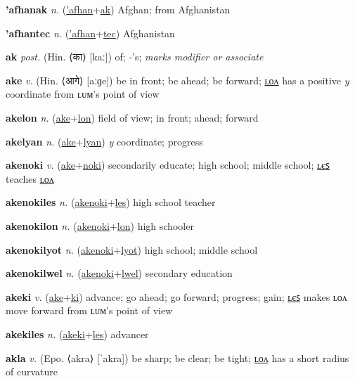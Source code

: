 \textbf{\hypertarget{'afhanak}{'afhanak}} \textit{n.} (\hyperlink{'afhan}{'afhan}+\allowbreak \hyperlink{ak}{ak})
Afghan; from Afghanistan

\textbf{\hypertarget{'afhantec}{'afhantec}} \textit{n.} (\hyperlink{'afhan}{'afhan}+\allowbreak \hyperlink{tec}{tec})
Afghanistan

\textbf{\hypertarget{ak}{ak}} \textit{post.} (Hin. ⟨{\devanagari{}का}⟩ [kaː])
of; -’s; \textit{marks modifier or associate}

\textbf{\hypertarget{ake}{ake}} \textit{v.} (Hin. ⟨{\devanagari{}आगे}⟩ [aːɡe])
be in front; be ahead; be forward; \hyperlink{akelon}{ʟᴏᴧ} has a positive \textit{y} coordinate from ʟᴜᴍ’s point of view

\textbf{\hypertarget{akelon}{akelon}} \textit{n.} (\hyperlink{ake}{ake}+\allowbreak \hyperlink{lon}{lon})
field of view; in front; ahead; forward

\textbf{\hypertarget{akelyan}{akelyan}} \textit{n.} (\hyperlink{ake}{ake}+\allowbreak \hyperlink{lyan}{lyan})
\textit{y} coordinate; progress

\textbf{\hypertarget{akenoki}{akenoki}} \textit{v.} (\hyperlink{ake}{ake}+\allowbreak \hyperlink{noki}{noki})
secondarily educate; high school; middle school; \hyperlink{akenokiles}{ʟєꜱ} teaches \hyperlink{akenokilon}{ʟᴏᴧ}

\textbf{\hypertarget{akenokiles}{akenokiles}} \textit{n.} (\hyperlink{akenoki}{akenoki}+\allowbreak \hyperlink{les}{les})
high school teacher

\textbf{\hypertarget{akenokilon}{akenokilon}} \textit{n.} (\hyperlink{akenoki}{akenoki}+\allowbreak \hyperlink{lon}{lon})
high schooler

\textbf{\hypertarget{akenokilyot}{akenokilyot}} \textit{n.} (\hyperlink{akenoki}{akenoki}+\allowbreak \hyperlink{lyot}{lyot})
high school; middle school

\textbf{\hypertarget{akenokilwel}{akenokilwel}} \textit{n.} (\hyperlink{akenoki}{akenoki}+\allowbreak \hyperlink{lwel}{lwel})
secondary education

\textbf{\hypertarget{akeki}{akeki}} \textit{v.} (\hyperlink{ake}{ake}+\allowbreak \hyperlink{ki}{ki})
advance; go ahead; go forward; progress; gain; \hyperlink{akekiles}{ʟєꜱ} makes ʟᴏᴧ move forward from ʟᴜᴍ’s point of view

\textbf{\hypertarget{akekiles}{akekiles}} \textit{n.} (\hyperlink{akeki}{akeki}+\allowbreak \hyperlink{les}{les})
advancer

\textbf{\hypertarget{akla}{akla}} \textit{v.} (Epo. ⟨akra⟩ [ˈakra])
be sharp; be clear; be tight; \hyperlink{aklalon}{ʟᴏᴧ} has a short radius of curvature

